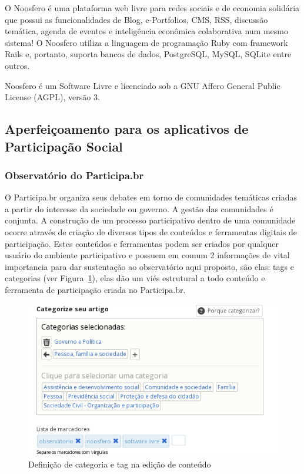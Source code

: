 \documentclass[12pt]{article}
\begin{document}
O Noosfero\cite{noosfero} é uma plataforma web livre para redes sociais e de
economia solidária que possui as funcionalidades de Blog, e-Portfolios, CMS,
RSS, discussão temática, agenda de eventos e inteligência econômica
colaborativa num mesmo sistema! O Noosfero utiliza a linguagem de programação
Ruby com framework Rails e, portanto, suporta bancos de dados, PostgreSQL,
MySQL, SQLite entre outros.

Noosfero é um Software Livre e licenciado sob a GNU Affero General Public
License (AGPL), versão 3.

\subsection{Aperfeiçoamento para os aplicativos de Participação Social}

\subsubsection{Observatório do Participa.br}

O Participa.br organiza seus debates em torno de comunidades temáticas criadas
a partir do interesse da sociedade ou governo. A gestão das comunidades é
conjunta. A construção de um processo participativo dentro de uma comunidade
ocorre através de criação de diversos tipos de conteúdos e ferramentas
digitais de participação. Estes conteúdos e ferramentas podem ser criados por
qualquer usuário do ambiente participativo e possuem em comum 2 informações de
vital importancia para dar sustentação ao observatório aqui proposto, são
elas: tags e categorias (ver Figura~\ref{categorias-tags}), elas dão um viés
estrutural a todo conteúdo e ferramenta de participação criada no
Participa.br.

\begin{figure}[h]
\center
\includegraphics[scale=0.6]{categorias-tags.png}
\caption{Definição de categoria e tag na edição de conteúdo}
\label{categorias-tags}
\end{figure}
\end{document}
